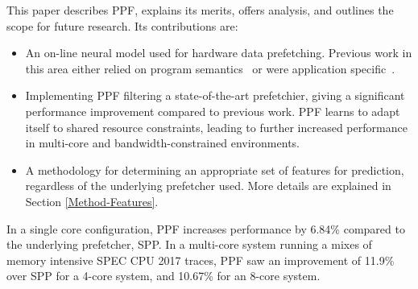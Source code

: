 
This paper describes PPF, explains its merits, offers analysis, and
outlines the scope for future research. Its contributions are:

\begin{itemize}

\item An on-line neural model used for hardware data prefetching.  Previous
work in this area either relied on program semantics~\cite{Semantics} or were
application specific~\cite{Datacenter}.

\item Implementing PPF filtering a state-of-the-art prefetchier, giving a
significant performance improvement compared to previous work.  PPF learns to
adapt itself to shared resource constraints, leading to further increased
performance in multi-core and bandwidth-constrained environments.

\item A methodology for determining an appropriate set of features for
prediction, regardless of the underlying prefetcher used.  More details are
explained in Section \ref{Method-Features}.

\end{itemize}

In a single core configuration, PPF increases performance by 6.84\%
compared to the underlying prefetcher, SPP.  In a multi-core system running a
mixes of memory intensive SPEC CPU 2017 traces, PPF saw an improvement
of 11.9\% over SPP for a 4-core system, and 10.67\% for an 8-core system.

